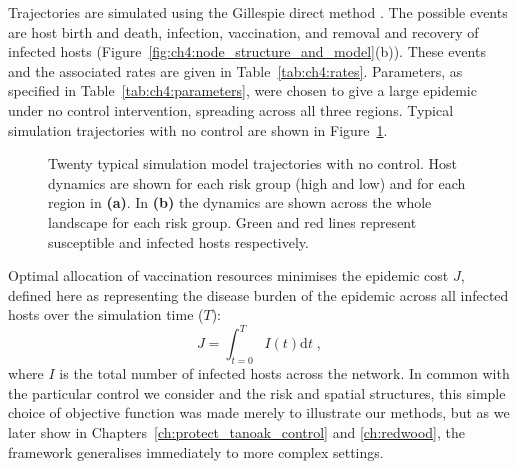 Trajectories are simulated using the Gillespie direct method \citep{gillespie_exact_1977}. The possible events are host birth and death, infection, vaccination, and removal and recovery of infected hosts (Figure~\ref{fig:ch4:node_structure_and_model}(b)). These events and the associated rates are given in Table~\ref{tab:ch4:rates}. Parameters, as specified in Table~\ref{tab:ch4:parameters}, were chosen to give a large epidemic under no control intervention, spreading across all three regions. Typical simulation trajectories with no control are shown in Figure~\ref{fig:ch4:no_control_dpc}.

\begin{figure}[htb]
    \begin{center}
        \caption[Uncontrolled network model dynamics]{Twenty typical simulation model trajectories with no control. Host dynamics are shown for each risk group (high and low) and for each region in \textbf{(a)}. In \textbf{(b)} the dynamics are shown across the whole landscape for each risk group. Green and red lines represent susceptible and infected hosts respectively.\label{fig:ch4:no_control_dpc}}
    \end{center}
\end{figure}

Optimal allocation of vaccination resources minimises the epidemic cost $J$, defined here as representing the disease burden of the epidemic across all infected hosts over the simulation time ($T$):
\begin{equation}
    J = \int_{t=0}^TI(t)\mathrm{d}t\;,
\end{equation}
where $I$ is the total number of infected hosts across the network. In common with the particular control we consider and the risk and spatial structures, this simple choice of objective function was made merely to illustrate our methods, but as we later show in Chapters~\ref{ch:protect_tanoak_control} and \ref{ch:redwood}, the framework generalises immediately to more complex settings.

